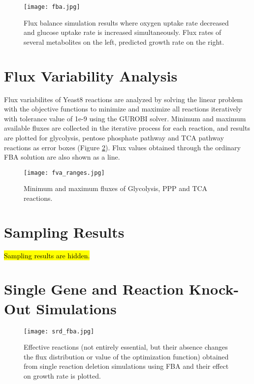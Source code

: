 \begin{figure}[H]
\begin{center}
\texttt{[image: fba.jpg]}
\end{center}
\caption[Flux balance simulation results]{Flux balance simulation results where oxygen uptake rate decreased and glucose uptake rate is increased simultaneously. Flux rates of several metabolites on the left, predicted growth rate on the right.}
\label{fig:fba}
\end{figure}

\section{Flux Variability Analysis}
Flux variabilites of Yeast8 reactions are analyzed by solving the linear problem with the objective functions to minimize and maximize all reactions iteratively with tolerance value of 1e-9 using the GUROBI solver. Minimum and maximum available fluxes are collected in the iterative process for each reaction, and results are plotted for glycolysis, pentose phosphate pathway and TCA pathway reactions as error boxes (Figure \ref{fig:fva}). Flux values obtained through the ordinary FBA solution are also shown as a line.

\begin{figure}[H]
\begin{center}
\texttt{[image: fva\_ranges.jpg]}
\end{center}
\caption[Minimum and maximum fluxes of Glycolysis, PPP and TCA reactions]{Minimum and maximum fluxes of Glycolysis, PPP and TCA reactions.}
\label{fig:fva}
\end{figure}


\section{Sampling Results}

\hl{Sampling results are hidden.}
% 


\section{Single Gene and Reaction Knock-Out Simulations}

\begin{figure}[H]
\begin{center}
\texttt{[image: srd\_fba.jpg]}
\end{center}
\caption[Effective reactions found from the deletion analysis using FBA]{Effective reactions (not entirely essential, but  their absence changes the flux distribution or value of the optimization function) obtained from single reaction deletion simulations using FBA and their effect on growth rate is plotted.}
\label{fig:srd_fba}
\end{figure}

